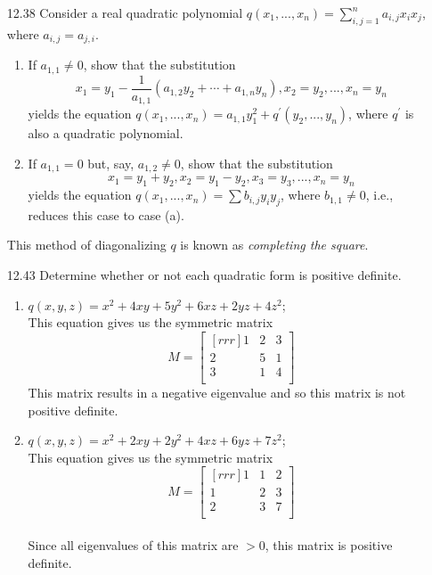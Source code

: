 \documentclass[12pt]{article}
\theoremstyle{definition}
\theoremstyle{plain}
\begin{document}
\begin{enumerate}
\item[12.38]Consider a real quadratic polynomial $q(x_1,...,x_n)=\sum_{i,j=1}^na_{i,j}x_ix_j$, where $a_{i,j}=a_{j,i}$.
	\begin{enumerate}
	\item If $a_{1,1}\neq 0$, show that the substitution
	\[ x_1=y_1-\dfrac{1}{a_{1,1}}(a_{1,2}y_2+\cdots+a_{1,n}y_n), x_2=y_2,...,x_n=y_n \]
	yields the equation $q(x_1,...,x_n)=a_{1,1}y_1^2+q^\prime(y_2,...,y_n)$, where $q^\prime$ is also a quadratic polynomial.
	\item If $a_{1,1}=0$ but, say, $a_{1,2}\neq 0$, show that the substitution
	\[ x_1=y_1+y_2,x_2=y_1-y_2,x_3=y_3,...,x_n=y_n \]
	yields the equation $q(x_1,...,x_n)=\sum b_{i,j}y_iy_j$, where $b_{1,1}\neq 0$, i.e., reduces this case to case (a).
	\end{enumerate}
	This method of diagonalizing $q$ is known as \textit{completing the square}.
\item[12.43]Determine whether or not each quadratic form is positive definite.
	\begin{enumerate}
	\item $q(x,y,z)=x^2+4xy+5y^2+6xz+2yz+4z^2$;\\
		This equation gives us the symmetric matrix
		\[ M= \begin{bmatrix}[rrr]1&2&3\\2&5&1\\3&1&4\\\end{bmatrix} \]
		This matrix results in a negative eigenvalue and so this matrix is not positive definite.
	\item $q(x,y,z)=x^2+2xy+2y^2+4xz+6yz+7z^2$;\\
		This equation gives us the symmetric matrix
		\[ M = \begin{bmatrix}[rrr]1&1&2\\1&2&3\\2&3&7\\\end{bmatrix} \]\\
		Since all eigenvalues of this matrix are $> 0$, this matrix is positive definite.
	\end{enumerate}
\end{enumerate}
\end{document}
